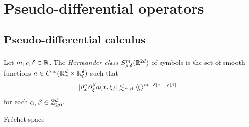\documentclass{../../large}
\begin{document}
\chapter{}









\part{Pseudo-differential operators}


\chapter{Pseudo-differential calculus}
\section{}

\begin{prb}
Let $m,\rho,\delta\in\mathbb{R}$.
The \emph{H\"ormander class} $S_{\rho,\delta}^m(\mathbb{R}^{2d})$ of symbols is the set of smooth functions $a\in C^\infty(\mathbb{R}_x^d\times\mathbb{R}_\xi^d)$ such that
\[|\partial_x^\alpha\partial_\xi^\beta a(x,\xi)|\lesssim_{\alpha,\beta}\langle\xi\rangle^{m+\delta|\alpha|-\rho|\beta|}\]
for each $\alpha,\beta\in\mathbb{Z}_{\ge0}^d$.
\begin{parts}
\item Fr\'echet space
\end{parts}
\end{prb}
\end{document}
